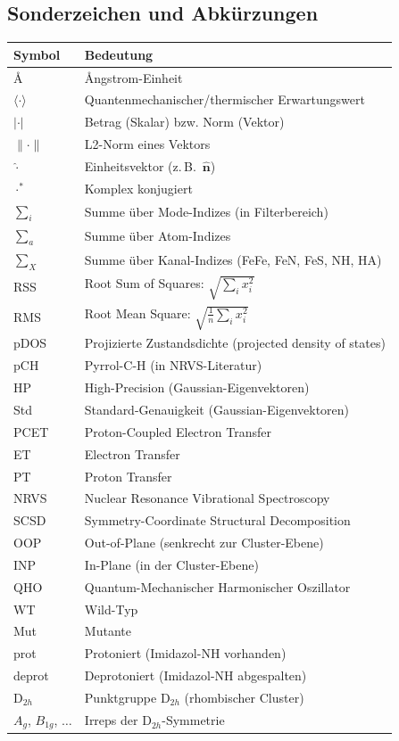 \documentclass[11pt,a4paper,twoside]{article}
\providecommand{\angstrom}{\text{\AA}}    %
\theoremstyle{remark}
\begin{document}
\subsection{Sonderzeichen und Abk\"urzungen}

\begin{tabular}{p{2cm} p{8.5cm}}
  \toprule
  \textbf{Symbol} & \textbf{Bedeutung} \\
  \midrule
  $\angstrom$    & \AA{}ngstrom-Einheit \\
  $\langle\cdot\rangle$ & Quantenmechanischer/thermischer Erwartungswert \\
  $|\cdot|$      & Betrag (Skalar) bzw. Norm (Vektor) \\
  $\|\cdot\|$    & L2-Norm eines Vektors \\
  $\hat{\cdot}$  & Einheitsvektor (z.\,B.\ $\hat{\mathbf{n}}$) \\
  $\cdot^*$      & Komplex konjugiert \\
  $\sum_i$       & Summe \"uber Mode-Indizes (in Filterbereich) \\
  $\sum_a$       & Summe \"uber Atom-Indizes \\
  $\sum_X$       & Summe \"uber Kanal-Indizes (FeFe, FeN, FeS, NH, HA) \\
  RSS            & Root Sum of Squares: $\sqrt{\sum_i x_i^2}$ \\
  RMS            & Root Mean Square: $\sqrt{\frac{1}{n}\sum_i x_i^2}$ \\
  pDOS           & Projizierte Zustandsdichte (projected density of states) \\
  pCH            & Pyrrol-C-H (in NRVS-Literatur) \\
  HP             & High-Precision (Gaussian-Eigenvektoren) \\
  Std            & Standard-Genauigkeit (Gaussian-Eigenvektoren) \\
  PCET           & Proton-Coupled Electron Transfer \\
  ET             & Electron Transfer \\
  PT             & Proton Transfer \\
  NRVS           & Nuclear Resonance Vibrational Spectroscopy \\
  SCSD           & Symmetry-Coordinate Structural Decomposition \\
  OOP            & Out-of-Plane (senkrecht zur Cluster-Ebene) \\
  INP            & In-Plane (in der Cluster-Ebene) \\
  QHO            & Quantum-Mechanischer Harmonischer Oszillator \\
  WT             & Wild-Typ \\
  Mut            & Mutante \\
  prot           & Protoniert (Imidazol-NH vorhanden) \\
  deprot         & Deprotoniert (Imidazol-NH abgespalten) \\
  D$_{2h}$       & Punktgruppe D$_{2h}$ (rhombischer Cluster) \\
  $A_g$, $B_{1g}$, $\ldots$ & Irreps der D$_{2h}$-Symmetrie \\
  \bottomrule
\end{tabular}
\end{document}

